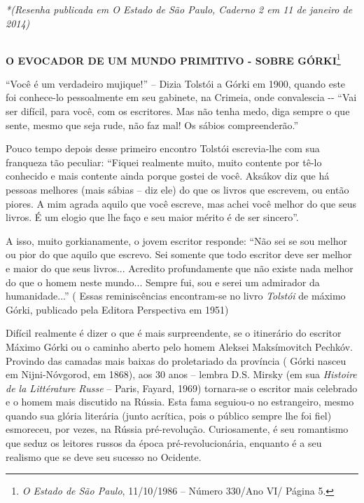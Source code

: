 \emph{*(}\protect\hypertarget{__DdeLink__16897_1485881000}{}{\protect\hypertarget{__DdeLink__16895_1485881000}{}{}}\emph{Resenha
publicada em O Estado de São Paulo, Caderno 2 em 11 de janeiro de 2014)}

\subsection{}\label{section}

\textbf{O EVOCADOR DE UM MUNDO PRIMITIVO - SOBRE GÓRKI}\footnote{\emph{O
  Estado de São Paulo}, 11/10/1986 -- Número 330/Ano VI/ Página 5.}

``Você é um verdadeiro mujique!'' -- Dizia Tolstói a Górki em 1900,
quando este foi conhece-lo pessoalmente em seu gabinete, na Crimeia,
onde convalescia -\/- ``Vai ser difícil, para você, com os escritores.
Mas não tenha medo, diga sempre o que sente, mesmo que seja rude, não
faz mal! Os sábios compreenderão.''

Pouco tempo depois desse primeiro encontro Tolstói escrevia-lhe com sua
franqueza tão peculiar: ``Fiquei realmente muito, muito contente por
tê-lo conhecido e mais contente ainda porque gostei de você. Aksákov diz
que há pessoas melhores (mais sábias -- diz ele) do que os livros que
escrevem, ou então piores. A mim agrada aquilo que você escreve, mas
achei você melhor do que seus livros. É um elogio que lhe faço e seu
maior mérito é de ser sincero''.

A isso, muito gorkianamente, o jovem escritor responde: ``Não sei se sou
melhor ou pior do que aquilo que escrevo. Sei somente que todo escritor
deve ser melhor e maior do que seus livros... Acredito profundamente que
não existe nada melhor do que o homem neste mundo... Sempre fui, sou e
serei um admirador da humanidade...'' ( Essas reminiscências
encontram-se no livro \emph{Tolstói} de máximo Górki, publicado pela
Editora Perspectiva em 1951)

Difícil realmente é dizer o que é mais surpreendente, se o itinerário do
escritor Máximo Górki ou o caminho aberto pelo homem Aleksei
Maksímovitch Pechkóv. Provindo das camadas mais baixas do proletariado
da província ( Górki nasceu em Nijni-Nóvgorod, em 1868), aos 30 anos --
lembra D.S. Mirsky (em sua \emph{Histoire de la Littérature Russe} --
Paris, Fayard, 1969) tornara-se o escritor mais celebrado e o homem mais
discutido na Rússia. Esta fama seguiou-o no estrangeiro, mesmo quando
sua glória literária (junto acrítica, pois o público sempre lhe foi
fiel) esmoreceu, por vezes, na Rússia pré-revolução. Curiosamente, é seu
romantismo que seduz os leitores russos da época pré-revolucionária,
enquanto é a seu realismo que se deve seu sucesso no Ocidente.

